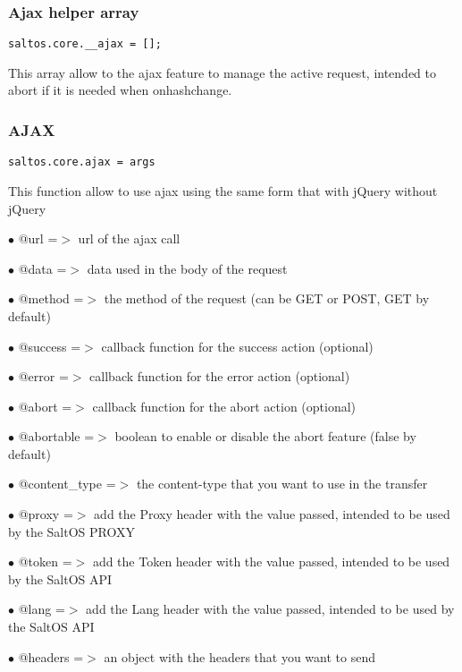 \documentclass[a4paper]{article}
\begin{document}
\hypertarget{toc702}{}
\subsubsection{Ajax helper array}

\begin{lstlisting}
saltos.core.__ajax = [];
\end{lstlisting}

This array allow to the ajax feature to manage the active request, intended to abort
if it is needed when onhashchange.

\hypertarget{toc703}{}
\subsubsection{AJAX}

\begin{lstlisting}
saltos.core.ajax = args
\end{lstlisting}

This function allow to use ajax using the same form that with jQuery without jQuery

\begin{compactitem}
\item[\color{myblue}$\bullet$] @url          =$>$ url of the ajax call
\item[\color{myblue}$\bullet$] @data         =$>$ data used in the body of the request
\item[\color{myblue}$\bullet$] @method       =$>$ the method of the request (can be GET or POST, GET by default)
\item[\color{myblue}$\bullet$] @success      =$>$ callback function for the success action (optional)
\item[\color{myblue}$\bullet$] @error        =$>$ callback function for the error action (optional)
\item[\color{myblue}$\bullet$] @abort        =$>$ callback function for the abort action (optional)
\item[\color{myblue}$\bullet$] @abortable    =$>$ boolean to enable or disable the abort feature (false by default)
\item[\color{myblue}$\bullet$] @content\_type =$>$ the content-type that you want to use in the transfer
\item[\color{myblue}$\bullet$] @proxy        =$>$ add the Proxy header with the value passed, intended to be used by the SaltOS PROXY
\item[\color{myblue}$\bullet$] @token        =$>$ add the Token header with the value passed, intended to be used by the SaltOS API
\item[\color{myblue}$\bullet$] @lang         =$>$ add the Lang header with the value passed, intended to be used by the SaltOS API
\item[\color{myblue}$\bullet$] @headers      =$>$ an object with the headers that you want to send
\end{compactitem}
\end{document}
